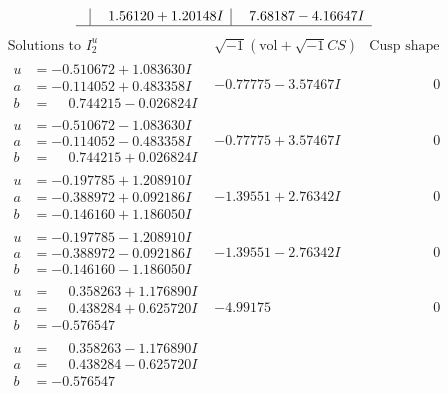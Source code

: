 \documentclass[1p]{elsarticle_modified}
\theoremstyle{definition}
\newcommand{\I}{\sqrt{-1}}
\begin{document}
$$\begin{array}{c|c|c}
 & \phantom{-}1.56120 + 1.20148 I & \phantom{-}7.68187 - 4.16647 I\\
 \hline 
 \end{array}$$\newpage$$\begin{array}{c|c|c}  
\text{Solutions to }I^u_{2}& \I (\text{vol} + \sqrt{-1}CS) & \text{Cusp shape}\\
 \hline 
\begin{aligned}
u &= -0.510672 + 1.083630 I \\
a &= -0.114052 + 0.483358 I \\
b &= \phantom{-}0.744215 - 0.026824 I\end{aligned}
 & -0.77775 - 3.57467 I & \phantom{-0.000000 } 0 \\ \hline\begin{aligned}
u &= -0.510672 - 1.083630 I \\
a &= -0.114052 - 0.483358 I \\
b &= \phantom{-}0.744215 + 0.026824 I\end{aligned}
 & -0.77775 + 3.57467 I & \phantom{-0.000000 } 0 \\ \hline\begin{aligned}
u &= -0.197785 + 1.208910 I \\
a &= -0.388972 + 0.092186 I \\
b &= -0.146160 + 1.186050 I\end{aligned}
 & -1.39551 + 2.76342 I & \phantom{-0.000000 } 0 \\ \hline\begin{aligned}
u &= -0.197785 - 1.208910 I \\
a &= -0.388972 - 0.092186 I \\
b &= -0.146160 - 1.186050 I\end{aligned}
 & -1.39551 - 2.76342 I & \phantom{-0.000000 } 0 \\ \hline\begin{aligned}
u &= \phantom{-}0.358263 + 1.176890 I \\
a &= \phantom{-}0.438284 + 0.625720 I \\
b &= -0.576547\phantom{ +0.000000I}\end{aligned}
 & -4.99175\phantom{ +0.000000I} & \phantom{-0.000000 } 0 \\ \hline\begin{aligned}
u &= \phantom{-}0.358263 - 1.176890 I \\
a &= \phantom{-}0.438284 - 0.625720 I \\
b &= -0.576547\phantom{ +0.000000I}\end{aligned}

\end{array}$$
\end{document}
